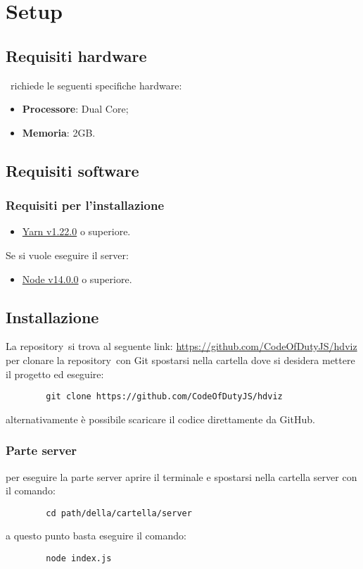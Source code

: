 \section{Setup}
    \subsection{Requisiti hardware}
    \hd\ richiede le seguenti specifiche hardware:
    \begin{itemize}
        \item \textbf{Processore}: Dual Core;
        \item \textbf{Memoria}: 2GB.
    \end{itemize}
    \subsection{Requisiti software}
        \subsubsection{Requisiti per l'installazione}
        \begin{itemize}
            \item \href{https://yarnpkg.com/}{Yarn v1.22.0} o superiore.
        \end{itemize}
        Se si vuole eseguire il server:
        \begin{itemize}
            \item \href{https://nodejs.org/en/}{Node v14.0.0} o superiore.
        \end{itemize}
    \subsection{Installazione}
    La repository\glo\ si trova al seguente link:
    \href{https://github.com/CodeOfDutyJS/hdviz}{https://github.com/CodeOfDutyJS/hdviz}
    \\
    per clonare la repository\glo\ con Git spostarsi nella cartella dove si desidera mettere il progetto ed eseguire:
    \begin{verbatim}
        git clone https://github.com/CodeOfDutyJS/hdviz
    \end{verbatim}
    alternativamente è possibile scaricare il codice direttamente da GitHub\glo .
        \subsubsection{Parte server}
        per eseguire la parte server aprire il terminale e spostarsi nella cartella server con il comando:
        \begin{verbatim}
        cd path/della/cartella/server
        \end{verbatim}
        a questo punto basta eseguire il comando:
        \begin{verbatim}
        node index.js
        \end{verbatim}
